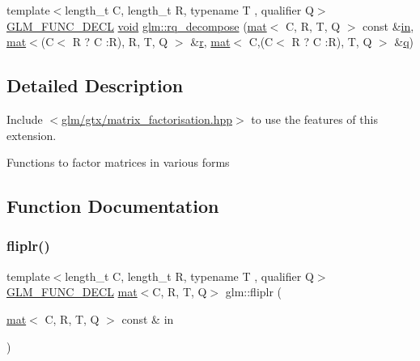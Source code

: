 \begin{DoxyCompactItemize}
\item 
{\footnotesize template$<$length\+\_\+t C, length\+\_\+t R, typename T , qualifier Q$>$ }\\\hyperlink{setup_8hpp_ab2d052de21a70539923e9bcbf6e83a51}{G\+L\+M\+\_\+\+F\+U\+N\+C\+\_\+\+D\+E\+CL} \hyperlink{_s_d_l__opengles2__gl2ext_8h_ae5d8fa23ad07c48bb609509eae494c95}{void} \hyperlink{group__gtx__matrix__factorisation_ga4e022709c9e7eaad9d7cc315d2cdb05c}{glm\+::rq\+\_\+decompose} (\hyperlink{structglm_1_1mat}{mat}$<$ C, R, T, Q $>$ const \&\hyperlink{_s_d_l__opengl__glext_8h_a83ad0ee7f1e06b59c90271716e689080}{in}, \hyperlink{structglm_1_1mat}{mat}$<$(C$<$ R ? C \+:R), R, T, Q $>$ \&\hyperlink{_s_d_l__opengl_8h_a42ce7cdc612e53abee15043f80220d97}{r}, \hyperlink{structglm_1_1mat}{mat}$<$ C,(C$<$ R ? C \+:R), T, Q $>$ \&\hyperlink{_s_d_l__opengl_8h_a8fc1e7b9baaae687804c7eed46ca09c6}{q})
\end{DoxyCompactItemize}


\subsection{Detailed Description}
Include $<$\hyperlink{matrix__factorisation_8hpp}{glm/gtx/matrix\+\_\+factorisation.\+hpp}$>$ to use the features of this extension.

Functions to factor matrices in various forms 

\subsection{Function Documentation}
\mbox{\label{group__gtx__matrix__factorisation_gaf39f4e5f78eb29c1a90277d45b9b3feb}} 
\subsubsection{\texorpdfstring{fliplr()}{fliplr()}}
{\footnotesize\ttfamily template$<$length\+\_\+t C, length\+\_\+t R, typename T , qualifier Q$>$ \\
\hyperlink{setup_8hpp_ab2d052de21a70539923e9bcbf6e83a51}{G\+L\+M\+\_\+\+F\+U\+N\+C\+\_\+\+D\+E\+CL} \hyperlink{structglm_1_1mat}{mat}$<$C, R, T, Q$>$ glm\+::fliplr (\begin{DoxyParamCaption}\item[{\hyperlink{structglm_1_1mat}{mat}$<$ C, R, T, Q $>$ const \&}]{in }\end{DoxyParamCaption})}

